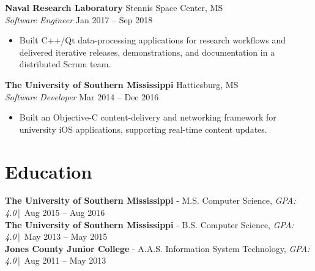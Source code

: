 \documentclass[10pt]{article}
\begin{document}
\textbf{Naval Research Laboratory} \hfill Stennis Space Center, MS \\
\textit{Software Engineer} \hfill Jan 2017 -- Sep 2018
\begin{itemize}
  \item Built C++/Qt data-processing applications for research workflows and delivered iterative
  releases, demonstrations, and documentation in a distributed Scrum team.
\end{itemize}

\textbf{The University of Southern Mississippi} \hfill Hattiesburg, MS \\
\textit{Software Developer} \hfill Mar 2014 -- Dec 2016
\begin{itemize}
  \item Built an Objective-C content-delivery and networking framework for university iOS
  applications, supporting real-time content updates.
\end{itemize}

\vspace{-2mm}
\section*{Education}
\textbf{The University of Southern Mississippi} - M.S. Computer Science, \textit{GPA: 4.0}\,|\, Aug 2015 -- Aug 2016 \\
\textbf{The University of Southern Mississippi} - B.S. Computer Science, \textit{GPA: 4.0}\,|\, May 2013 -- May 2015 \\
\textbf{Jones County Junior College} - A.A.S. Information System Technology, \textit{GPA: 4.0}\,|\, Aug 2011 -- May 2013
\end{document}
